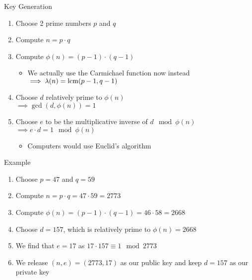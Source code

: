 \documentclass[handout, aspectratio=169]{beamer}
\begin{document}
\begin{frame}{Key Generation}
    \begin{enumerate}
        \item Choose 2 prime numbers $p$ and $q$ \pause
        \item Compute $n = p \cdot q$ \pause
        \item Compute $\phi(n) = (p - 1) \cdot (q - 1)$
        \begin{itemize}
            \item We actually use the Carmichael function now instead \\
            $\implies \lambda(n) = \operatorname{lcm}(p - 1, q - 1)$
        \end{itemize}\pause
        \item Choose $d$ relatively prime to $\phi(n)$ \\ $\implies \gcd(d, \phi(n)) = 1$ \pause
        \item Choose $e$ to be the multiplicative inverse of $d \mod \phi(n)$ \\ $\implies e \cdot d = 1 \mod \phi(n)$ 
        \begin{itemize}
            \item Computers would use Euclid's algorithm \\
        \end{itemize}
    \end{enumerate}
\end{frame}

\begin{frame}{Example}
    \begin{enumerate}
        \item Choose $p = 47$ and $q = 59$ \pause
        \item Compute $n = p \cdot q = 47 \cdot 59 = 2773$ \pause
        \item Compute $\phi(n) = (p - 1) \cdot (q - 1) = 46 \cdot 58 = 2668$ \pause
        \item Choose $d = 157$, which is relatively prime to $\phi(n) = 2668$ \pause
        \item We find that $e = 17$ as $17 \cdot 157 \equiv 1 \mod 2773$ \pause
        \item We release $(n, e) = (2773, 17)$ as our public key and keep $d = 157$ as our private key
    \end{enumerate}
\end{frame}
\end{document}
